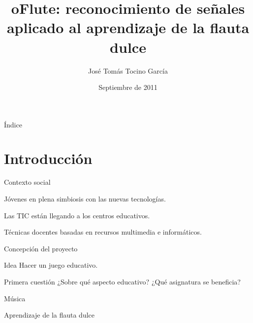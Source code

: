 \documentclass[11pt,xcolor=svgnames]{beamer}
\title{oFlute: reconocimiento de señales aplicado al aprendizaje de la flauta
  dulce}
\author{José Tomás Tocino García}
\institute[Universidad de Cádiz]{Universidad de Cádiz}
\date[Sept 2011]{Septiembre de 2011}
\begin{document}
{
  \begin{frame}
    \titlepage
  \end{frame}
}
\normalsize


\begin{frame}{Índice}
  \tableofcontents
\end{frame}


\section{Introducción}

\begin{frame}{Contexto social}
  \begin{center}
    \Large

    Jóvenes en plena simbiosis con las nuevas tecnologías.

    \bigskip
    \pause
    \bigskip

    Las TIC están llegando a los centros educativos.

    \bigskip
    \pause
    \bigskip

    Técnicas docentes basadas en recursos multimedia e informáticos.

  \end{center}
\end{frame}

\begin{frame}{Concepción del proyecto}
  \begin{block}{Idea}
    Hacer un juego educativo.
  \end{block}

  \pause

  \begin{block}{Primera cuestión}
    ¿Sobre qué aspecto educativo? ¿Qué asignatura se beneficia?
  \end{block}

  \vspace{0.5cm}
  \pause

  \begin{center}
    \LARGE Música \\[0.5cm]

    \pause

    \LARGE Aprendizaje de la flauta dulce
  \end{center}
\end{frame}
\end{document}
